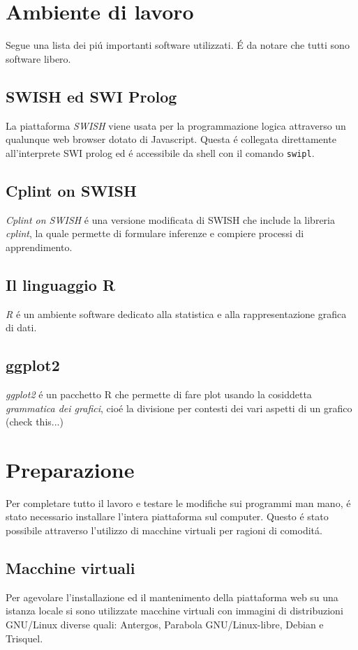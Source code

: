\documentclass[10pt,titlepage,twoside,a4paper]{report}
\begin{document}
\chapter{Ambiente di lavoro} \label{Ambiente di lavoro}
Segue una lista dei pi\'u importanti software utilizzati. \'E da notare che 
tutti sono software libero.

\section{SWISH ed SWI Prolog}
La piattaforma \emph{SWISH}\cite{SWISH} viene usata per la programmazione 
logica attraverso un qualunque web browser dotato di Javascript. Questa 
\'e collegata direttamente all'interprete SWI prolog ed \'e accessibile da 
shell con il comando \texttt{swipl}.

\section{Cplint on SWISH}
\emph{Cplint on SWISH} \'e una versione modificata di SWISH che include la 
libreria \emph{cplint}, la quale permette di formulare inferenze e 
compiere processi di apprendimento\cite{cplint}.

\section{Il linguaggio R}
\emph{R} \'e un ambiente software dedicato alla statistica e 
alla rappresentazione grafica di dati\cite{R}.

\section{ggplot2}
\emph{ggplot2} \'e un pacchetto R che permette di fare plot usando la 
cosiddetta \emph{grammatica dei grafici}, cio\'e la divisione per contesti dei 
vari aspetti di un grafico (check this...)


\chapter{Preparazione}
Per completare tutto il lavoro e testare le modifiche sui programmi man 
mano, \'e stato necessario installare l'intera piattaforma sul computer. 
Questo \'e stato possibile attraverso l'utilizzo di macchine virtuali 
per ragioni di comodit\'a.

\section{Macchine virtuali}
Per agevolare l'installazione ed il mantenimento della piattaforma web su una 
istanza locale si sono utilizzate macchine virtuali con immagini di 
distribuzioni GNU/Linux diverse quali: Antergos, Parabola GNU/Linux-libre, 
Debian e Trisquel.
\end{document}
